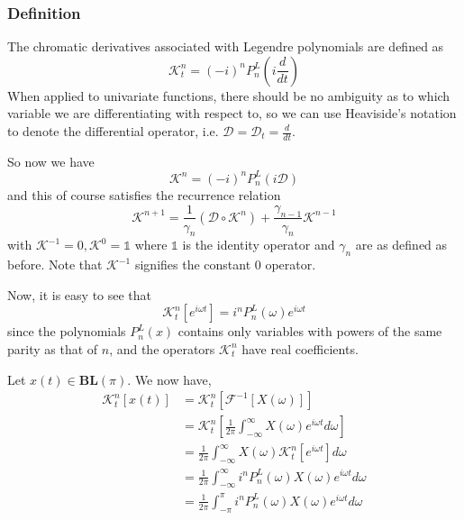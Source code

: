 \documentclass[11pt]{article} %
\theoremstyle{plain}
\theoremstyle{definition}
\theoremstyle{remark}
\begin{document}
\subsubsection{Definition}

The chromatic derivatives associated with Legendre polynomials are defined as
\begin{equation}
  \mathcal{K}_t^n = (-i)^n P_n^L \left (i \frac{d}{dt} \right )
\end{equation} 
When applied to univariate functions, there should be no ambiguity as to
which variable we are differentiating with respect to, so we can use Heaviside's
notation to denote the differential operator, i.e. $\mathcal{D} = \mathcal{D}_t 
= \frac{d}{dt}$. 

So now we have
\begin{equation}
  \mathcal{K}^n = (-i)^n P_n^L \left (i \mathcal{D} \right )
\end{equation}
and this of course satisfies the recurrence relation
\begin{equation}
  \mathcal{K}^{n+1} = \frac{1}{\gamma_n} \left ( \mathcal{D} \circ \mathcal{K}^n \right ) 
                        + \frac{\gamma_{n-1}}{\gamma_n} \mathcal{K}^{n-1}
\end{equation}
with $\mathcal{K}^{-1} = 0, \mathcal{K}^0 = \mathds{1}$ where $\mathds{1}$ is 
the identity operator and $\gamma_n$ are as defined as before. Note that 
$\mathcal{K}^{-1}$ signifies the constant 0 operator.

Now, it is easy to see that
\begin{equation}
  \mathcal{K}_t^n[e^{i\omega t}] = i^n P_n^L(\omega) e^{i\omega t}
\end{equation}
since the polynomials $P_n^L(x)$ contains only variables with powers of the same
parity as that of $n$, and the operators $\mathcal{K}_t^n$ have real coefficients.

Let $x(t) \in \mathbf{BL}(\pi)$. We now have,
\begin{align*}
  \mathcal{K}_t^n[x(t)]
    &= \mathcal{K}_t^n[\mathcal{F}^{-1}[X(\omega)]] \\
    &= \mathcal{K}_t^n \left [ \frac{1}{2 \pi} \int_{-\infty}^{\infty} X(\omega) e^{i \omega t} d\omega \right ] \\
    &= \frac{1}{2 \pi} \int_{-\infty}^{\infty} X(\omega) \mathcal{K}_t^n[e^{i \omega t}] d\omega \\
    &= \frac{1}{2 \pi} \int_{-\infty}^{\infty} i^n P_n^L(\omega) X(\omega) e^{i\omega t} d\omega \\
    &= \frac{1}{2 \pi} \int_{-\pi}^{\pi} i^n P_n^L(\omega) X(\omega) e^{i\omega t} d\omega \\
\end{align*}
\end{document}
